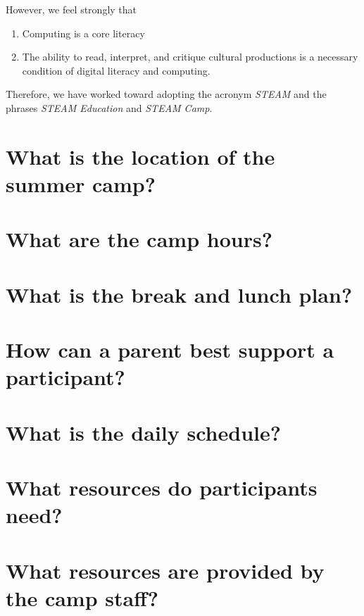 \documentclass[letterpaper,10pt,english]{sphinxmanual}
\begin{document}
However, we feel strongly that
\begin{enumerate}
\item {} 
Computing is a core literacy

\item {} 
The ability to read, interpret, and critique cultural productions is a necessary condition of digital literacy and computing.

\end{enumerate}

Therefore, we have worked toward adopting the acronym \emph{STEAM} and the phrases \emph{STEAM Education} and \emph{STEAM Camp}.


\section{What is the location of the summer camp?}
\label{faq:what-is-the-location-of-the-summer-camp}

\section{What are the camp hours?}
\label{faq:what-are-the-camp-hours}

\section{What is the break and lunch plan?}
\label{faq:what-is-the-break-and-lunch-plan}

\section{How can a parent best support a participant?}
\label{faq:how-can-a-parent-best-support-a-participant}

\section{What is the daily schedule?}
\label{faq:what-is-the-daily-schedule}

\section{What resources do participants need?}
\label{faq:what-resources-do-participants-need}

\section{What resources are provided by the camp staff?}
\label{faq:what-resources-are-provided-by-the-camp-staff}
\end{document}
